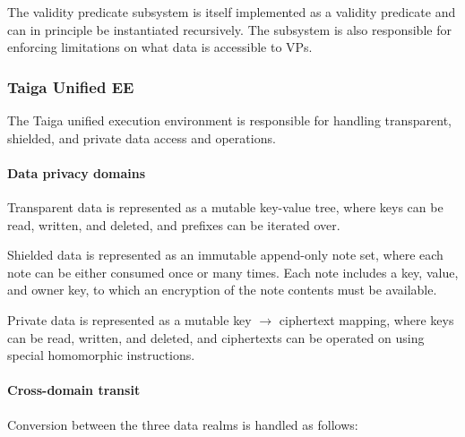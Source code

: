 \documentclass[
    9pt,            %
    commun,        %
    affiltop,       %
]{art}
\begin{document}
The validity predicate subsystem is itself implemented as a validity
predicate and can in principle be instantiated recursively. The
subsystem is also responsible for enforcing limitations on what data is
accessible to VPs.

\subsubsection{Taiga Unified EE}\label{taiga-unified-ee}

The Taiga unified execution environment is responsible for handling
transparent, shielded, and private data access and operations.

\paragraph{Data privacy domains}\label{data-privacy-domains}

Transparent data is represented as a mutable key-value tree, where keys
can be read, written, and deleted, and prefixes can be iterated over.

Shielded data is represented as an immutable append-only note set, where
each note can be either consumed once or many times. Each note includes
a key, value, and owner key, to which an encryption of the note contents
must be available.

Private data is represented as a mutable key $\to$ ciphertext
mapping, where keys can be read, written, and deleted, and ciphertexts
can be operated on using special homomorphic instructions.

\paragraph{Cross-domain transit}\label{cross-domain-transit}

Conversion between the three data realms is handled as follows:
\end{document}
